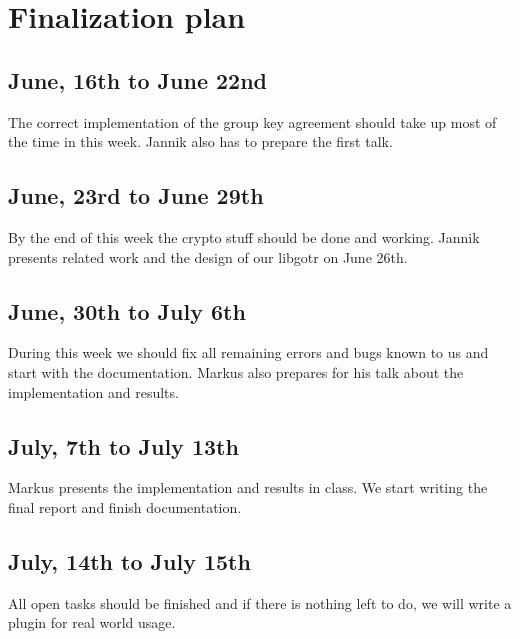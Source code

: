 \section{Finalization plan}

\subsection{June, 16th to June 22nd}

The correct implementation of the group key agreement should take up most of the
time in this week. Jannik also has to prepare the first talk.

\subsection{June, 23rd to June 29th}

By the end of this week the crypto stuff should be done and working. Jannik
presents related work and the design of our libgotr on June 26th.

\subsection{June, 30th to July 6th}

During this week we should fix all remaining errors and bugs known to us and
start with the documentation. Markus also prepares for his talk about the
implementation and results.

\subsection{July, 7th to July 13th}

Markus presents the implementation and results in class. We start writing the
final report and finish documentation.

\subsection{July, 14th to July 15th}

All open tasks should be finished and if there is nothing left to do, we will
write a plugin for real world usage.


